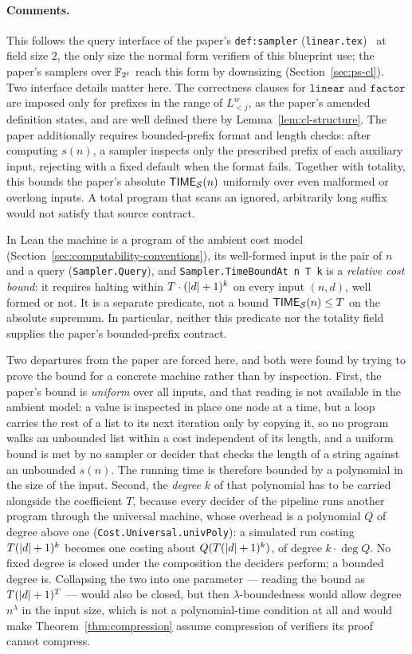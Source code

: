 \paragraph{Comments.} This follows the query interface of the paper's
\texttt{def:sampler} (\texttt{linear.tex})~\cite{AuditSync26} at
field size $2$, the only size the normal form verifiers of this blueprint use; the paper's
samplers over $\mathbb{F}_{2^t}$ reach this form by downsizing (Section~\ref{sec:ps-cl}). Two
interface details matter here. The correctness clauses for $\mathtt{linear}$ and $\mathtt{factor}$
are imposed only for prefixes in the range of $L^w_{<j}$, as the paper's amended definition
states, and are well defined there by Lemma~\ref{lem:cl-structure}. The paper additionally
requires bounded-prefix format and length checks: after computing $s(n)$, a sampler
inspects only the prescribed prefix of each auxiliary input, rejecting with a fixed default
when the format fails. Together with totality, this bounds the paper's absolute
$\mathsf{TIME}_{\mathcal{S}}(n)$ uniformly over even malformed or overlong inputs. A total program
that scans an ignored, arbitrarily long suffix would not satisfy that source contract.

In Lean the machine is a program of the ambient cost model
(Section~\ref{sec:computability-conventions}), its well-formed input is the pair of $n$
and a query (\texttt{Sampler.Query}), and \texttt{Sampler.TimeBoundAt n T k} is a
\emph{relative cost bound}: it requires halting within
$T\cdot(\left\vert {d} \right\vert+1)^k$ on every input $(n,d)$, well formed or not. It is a separate
predicate, not a bound $\mathsf{TIME}_{\mathcal{S}}(n)\leq T$ on the absolute supremum. In particular,
neither this predicate nor the totality field supplies the paper's bounded-prefix contract.

Two departures from the paper are forced here, and both were found by trying to prove the
bound for a concrete machine rather than by inspection. First, the paper's bound is
\emph{uniform} over all inputs, and that reading is not available in the ambient model: a
value is inspected in place one node at a time, but a loop carries the rest of a list to its
next iteration only by copying it, so no program walks an unbounded list within a cost
independent of its length, and a uniform bound is met by no sampler or decider that checks
the length of a string against an unbounded $s(n)$. The running time is therefore bounded by a
polynomial in the size of the input. Second, the \emph{degree} $k$ of that polynomial has to
be carried alongside the coefficient $T$, because every decider of the pipeline runs another
program through the universal machine, whose overhead is a polynomial $Q$ of degree above one
(\texttt{Cost.Universal.univPoly}): a simulated run costing $T (\left\vert {d} \right\vert+1)^k$ becomes one
costing about $Q(T (\left\vert {d} \right\vert+1)^k)$, of degree $k \cdot \deg Q$. No fixed degree is closed
under the composition the deciders perform; a bounded degree is. Collapsing the two into one
parameter --- reading the bound as $T (\left\vert {d} \right\vert+1)^T$ --- would also be closed, but then
$\lambda$-boundedness would allow degree $n^\lambda$ in the input size, which is not a
polynomial-time condition at all and would make Theorem~\ref{thm:compression} assume
compression of verifiers its proof cannot compress.

